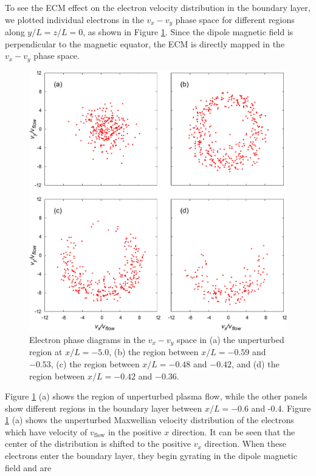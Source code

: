\documentclass[draft,jgrga]{agutex2015}
\begin{document}
\begin{article}
To see the ECM effect on the electron velocity distribution in the boundary layer, 
we plotted individual electrons in the $v_x-v_y$ phase space 
for different regions along $y/L=z/L=0$, as shown in Figure \ref{fig:10}.
Since the dipole magnetic field is perpendicular to the magnetic equator, 
the ECM is directly mapped in the $v_x-v_y$ phase space.
\begin{figure}
\centering
\noindent\includegraphics[width=15cm]{./figures/Fig_10_bb-crop.pdf}
\caption{
Electron phase diagrams in the $v_{x}-v_{y}$ space in 
(a) the unperturbed region at $x/L = -5.0$, 
(b) the region between $x/L =-0.59$ and $-0.53$,  
(c) the region between $x/L =-0.48$ and $-0.42$, and
(d) the region between $x/L =-0.42$ and $-0.36$.
}
\label{fig:10}
\end{figure}
Figure \ref{fig:10} (a) shows the region of 
unperturbed plasma flow, while the other panels
show different regions in the boundary layer between $x/L = -0.6$ and -0.4.
Figure \ref{fig:10} (a) shows the unperturbed Maxwellian velocity distribution of the electrons
which have velocity of $v_{\mathrm{flow}}$ in the positive $x$ direction.
It can be seen that the center of the distribution is shifted to the positive $v_x$ direction.
%
When these electrons enter the boundary layer, 
they begin gyrating in the dipole magnetic field and are

\end{article}
\end{document}
